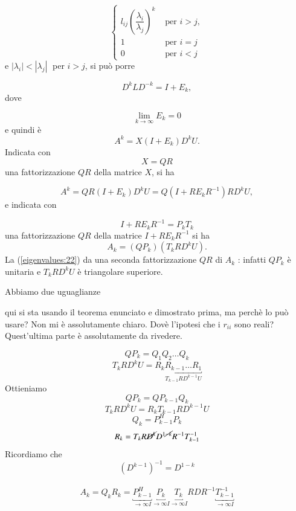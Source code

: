 \begin{thproof}
\begin{enumerate}
\begin{equation}
\label{eigenvalues:20}
  \left\{
 \begin{array}{ll}
  l_{ij}\left(\dfrac{\lambda_i}{\lambda_j} \right)^{k} & \text{ per } i > j, \\
  1 & \text{ per } i =j \\
  0 & \text{ per } i < j
 \end{array}
 \right.
\end{equation}
e $|\lambda_i | < |\lambda_j | \;$ per $i > j$, si pu\`o porre

$$D^k LD^{-k} = I + E_k,$$
dove

$$\lim_{k \to \infty} E_k = 0$$
e quindi \`e
$$A^k = X(I + E_k )D^k U.$$
Indicata con
$$X = QR$$
una fattorizzazione $QR$ della matrice $X$, si ha

$$A^k = QR(I + E_k )D^k U = Q(I + RE_k R^{-1} )RD^k U,$$
e indicata con

\begin{equation}
\label{eigenvalues:21}
I + RE_k R^{-1} = P_k T_k
\end{equation}
una fattorizzazione $QR$ della matrice $I + RE_k R^{-1}$ si ha
\begin{equation}
\label{eigenvalues:22}
A_k = (QP_k ) (T_k RD^k U ).
\end{equation}
La (\ref{eigenvalues:22}) da una seconda fattorizzazione $QR$ di $A_k$ :
infatti $QP_k$ \`e unitaria e $T_k RD^{k} U$ \`e triangolare superiore.
\end{enumerate}
Abbiamo due uguaglianze
\begin{openquestion}
qui si sta usando il teorema enunciato e dimostrato prima, ma perch\`e
lo pu\`o usare? Non mi \`e assolutamente chiaro. Dov\`e l'ipotesi che
i $r_{ii}$ sono reali? Quest'ultima parte \`e assolutamente da rivedere.
\end{openquestion}


$$ QP_k = Q_1 Q_2 \ldots Q_k$$
$$ T_kRD^{k} U = R_{k} \underbracket{R_{k-1} \ldots R_1}_{T_{k-1} RD^{k-1}U} $$
Ottieniamo
$$ QP_{k}= QP_{k-1} Q_k$$
$$ T_k RD^{k} U  = R_{k} T_{k-1} RD^{k-1} U$$
$$ Q_k = P_{k-1}^{H} P_k$$
$$ R_{k} = T_k R \cancel{D^{k}} D^{1\cancel{-k}} R^{-1} T^{-1}_{k-1}$$
Ricordiamo che
$$ (D^{k-1})^{-1}= D^{1-k}$$
\\
$$ A_k = Q_k R_k =
 \underbracket{P^{H}_{k-1}}_{\to \infty I}
\underbracket{P_{k}}_{\to \infty I}
\underbracket{ T_{k}}_{\to \infty I} RDR^{-1}
\underbracket{ T_{k-1}^{-1}}_{\to \infty I}
$$
\end{thproof}

